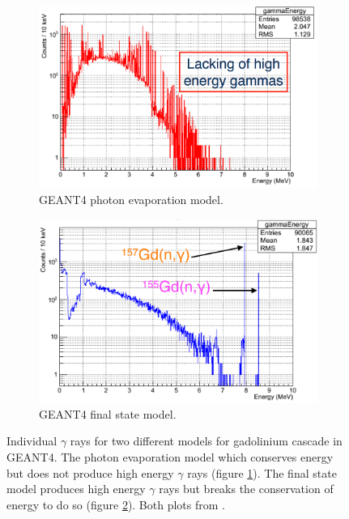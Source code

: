 \begin{figure}[htbp]
\centering
\begin{subfigure}{.5\textwidth}
  \centering
  \includegraphics[width=\linewidth]{Chapter4/Figs/Raster/gadolinium/photonEvaporationGd.png}
  \captionsetup{width=.9\linewidth}
  \caption{GEANT4 photon evaporation model.}
  \label{subFig:differentGeant4Models_photonEvaporationGd}
\end{subfigure}%
\begin{subfigure}{.5\textwidth}
  \centering
  \includegraphics[width=\linewidth]{Chapter4/Figs/Raster/gadolinium/FinalStateGd.png}
  \captionsetup{width=.9\linewidth}
  \caption{GEANT4 final state model.}
  \label{subFig:differentGeant4Models_finalStateGd}
\end{subfigure}
\caption{Individual $\gamma$ rays for two different models for gadolinium cascade in GEANT4. The photon evaporation model which conserves energy but does not produce high energy $\gamma$ rays (figure \ref{subFig:differentGeant4Models_photonEvaporationGd}). The final state model produces high energy $\gamma$ rays but breaks the conservation of energy to do so (figure \ref{subFig:differentGeant4Models_finalStateGd}). Both plots from \cite{YuChen_2015}.}
\label{fig:differentGeant4Models}
\end{figure}

